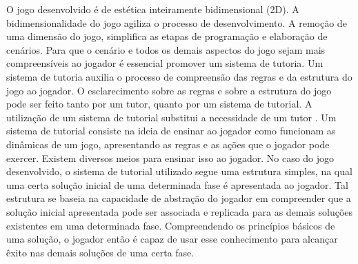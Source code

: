 
O jogo desenvolvido é de estética inteiramente bidimensional (2D). A bidimensionalidade do jogo agiliza o processo de desenvolvimento. A remoção de uma dimensão do jogo, simplifica as etapas de programação e elaboração de cenários. Para que o cenário e todos os demais aspectos do jogo sejam mais compreensíveis ao jogador é essencial promover um sistema de tutoria. Um sistema de tutoria auxilia o processo de compreensão das regras e da estrutura do jogo ao jogador. O esclarecimento sobre as regras e sobre a estrutura do jogo pode ser feito tanto por um tutor, quanto por um sistema de tutorial. A utilização de um sistema de tutorial substitui a necessidade de um tutor \cite{buchinger2014sherlock}. Um sistema de tutorial consiste na ideia de ensinar ao jogador como funcionam as dinâmicas de um jogo, apresentando as regras e as ações que o jogador pode exercer. Existem diversos meios para ensinar isso ao jogador. No caso do jogo desenvolvido, o sistema de tutorial utilizado segue uma estrutura simples, na qual uma certa solução inicial de uma determinada fase é apresentada ao jogador. Tal estrutura se baseia na capacidade de abstração do jogador em compreender que a solução inicial apresentada pode ser associada e replicada para as demais soluções existentes em uma determinada fase. Compreendendo os princípios básicos de uma solução, o jogador então é capaz de usar esse conhecimento para alcançar êxito nas demais soluções de uma certa fase. 


